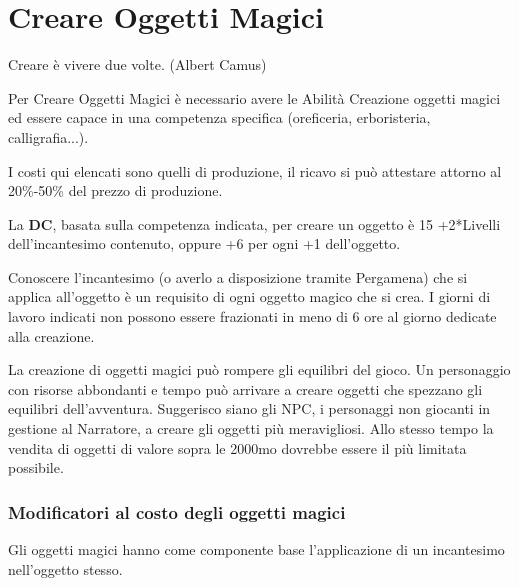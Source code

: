 \section{Creare Oggetti Magici}

\begin{enfasi}{
Creare è vivere due volte. (Albert Camus)
}\end{enfasi}

\begin{multicols}{2}

\label{creare-oggetti-magici}

Per Creare Oggetti Magici è necessario avere le Abilità Creazione oggetti magici ed essere capace in una competenza specifica (oreficeria, erboristeria, calligrafia...).

I costi qui elencati sono quelli di produzione, il ricavo si può attestare attorno al 20\%-50\% del prezzo di produzione.

La \textbf{DC}, basata sulla competenza indicata, per creare un oggetto è 15 +2*Livelli dell'incantesimo contenuto, oppure +6 per ogni +1 dell'oggetto.

Conoscere l'incantesimo (o averlo a disposizione tramite Pergamena) che si applica all'oggetto è un requisito di ogni oggetto magico che si crea. I giorni di lavoro indicati non possono essere frazionati in meno di 6 ore al giorno dedicate alla creazione.

\begin{narratore}
La creazione di oggetti magici può rompere gli equilibri del gioco. Un personaggio con risorse abbondanti e tempo può arrivare a creare oggetti che spezzano gli equilibri dell'avventura. Suggerisco siano gli NPC, i personaggi non giocanti in gestione al Narratore, a creare gli oggetti più meravigliosi. Allo stesso tempo la vendita di oggetti di valore sopra le 2000mo dovrebbe essere il più limitata possibile.
\end{narratore}

\subsubsection{Modificatori al costo degli oggetti magici}\label{modificatoricostooggettimagici}

Gli oggetti magici hanno come componente base l'applicazione di un incantesimo nell'oggetto stesso.


\end{multicols}
